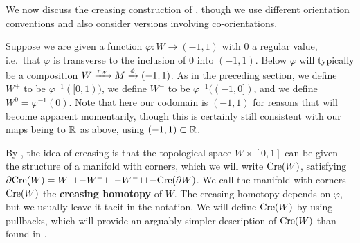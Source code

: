 \begin{comment}
To make this precise, suppose we are given a function $\varphi \colon W \to (-1,1)$ with $0$ a regular value, i.e.\ that $\varphi$ is transverse to the inclusion of $0$ into $(-1,1)$.
We define $W^+$ to be $\varphi^{-1}( [0,1))$, we define $W^-$ to be $\varphi^{-1} ((-1, 0])$, and we define $W^0 = \varphi^{-1}(0)$.
We have already seen this construction in \cref{E: manifold decomposition} and the examples in \cref{S: codim 0 and 1 co-or}, although we here replace the codomain $\R$ with $(-1,1)$ for reasons that will become apparent momentarily.
Nonetheless, the results of those examples carry over in the obvious way.

As in those earlier examples, $W^+$, $W^-$, and $W^0$ are manifolds with corners whose inclusions into $W$ are proper maps.
They are also the fiber products $[0,1)\times_\R W$, $(-1,0] \times_\R W$ and $0 \times_\R W$.
In those previous examples, we also considered the case of having an intermediary manifold $M$ so that $\varphi$ was a composition $W \xr{r_W} M \xr{\phi} \R$ with $0$ a regular value of both $\phi$ and $\phi r_W$.
In this case we also observed in \cref{E: manifold decomposition} that $W^0$ and $W^\pm$ are diffeomorphic to the respective fiber products $M^0 \times_M W$ and $M^{\pm} \times_M W$.
We will need these settings once we have finished with some preliminaries.
\end{comment}

We now discuss the creasing construction of \cite[Section 2.4]{Lipy14}, though we use different orientation conventions and also consider versions involving co-orientations.

Suppose we are given a function $\varphi \colon W \to (-1,1)$ with $0$ a regular value, i.e.\ that $\varphi$ is transverse to the inclusion of $0$ into $(-1,1)$.
Below $\varphi$ will typically be a composition $W \xrightarrow{r_W} M \xrightarrow{\phi} (-1,1)$.
As in the preceding section, we define $W^+$ to be $\varphi^{-1}( [0,1))$, we define $W^-$ to be $\varphi^{-1} ((-1, 0])$, and we define $W^0 = \varphi^{-1}(0)$.
Note that here our codomain is $(-1,1)$ for reasons that will become apparent momentarily, though this is certainly still consistent with our maps being to $\mathbb{R}$ as above, using $(-1,1) \subset \mathbb{R}$.

By \cite[Lemma~9]{Lipy14}, the idea of creasing is that the topological space $W \times [0,1]$ can be given the structure of a manifold with corners, which we will write $\mathrm{Cre}(W)$, satisfying $\partial \mathrm{Cre}(W) = W \sqcup -W^+ \sqcup -W^- \sqcup - \mathrm{Cre}(\partial W)$.
We call the manifold with corners $\mathrm{Cre}(W)$ the \textbf{creasing homotopy} of $W$.
The creasing homotopy depends on $\varphi$, but we usually leave it tacit in the notation.
We will define $\mathrm{Cre}(W)$ by using pullbacks, which will provide an arguably simpler description of $\mathrm{Cre}(W)$ than found in \cite{Lipy14}.

